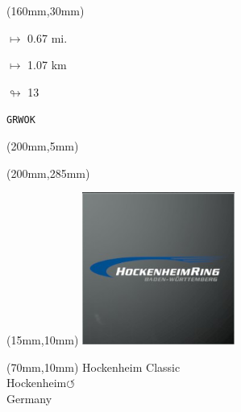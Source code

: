 \begin{textblock*}{40mm}(160mm,30mm)%
\Large
\par$\mapsto$ 0.67 mi.
\par$\mapsto$ 1.07 km
\par$\looparrowright$ 13
\par\hfill\tiny\tt GRWOK\\
\end{textblock*}
\begin{textblock*}{20mm}(200mm,5mm)%
\fbox{\thepage}
\label{GRWOK}
\end{textblock*}
\begin{textblock*}{20mm}(200mm,285mm)%
\fbox{\thepage}
\end{textblock*}

\null\newpage
\begin{textblock*}{50mm}(15mm,10mm)%
\includegraphics[width=50mm]{LG/2015-05-20_00082.png}
\end{textblock*}
\begin{textblock*}{130mm}(70mm,10mm)%
{\fontsize{20}{20}\selectfont Hockenheim Classic\\}
{\fontsize{16}{16}\selectfont Hockenheim\hfill \huge$\circlearrowleft$\\}
{\fontsize{12}{12}\selectfont Germany\\}
\end{textblock*}
